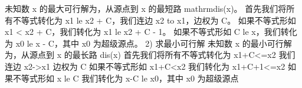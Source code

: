 {}\markdownRendererHardLineBreak
{}未知数 \markdownRendererDollarSign{}x\markdownRendererDollarSign{} 的最大可行解为，从源点到 \markdownRendererDollarSign{}x\markdownRendererDollarSign{} 的最短路 \markdownRendererDollarSign{}\markdownRendererBackslash{}mathrm\markdownRendererLeftBrace{}dis\markdownRendererRightBrace{}(x)\markdownRendererDollarSign{}。\markdownRendererHardLineBreak
{}首先我们将所有不等式转化为 \markdownRendererDollarSign{}x\markdownRendererUnderscore{}1 \markdownRendererBackslash{}le x\markdownRendererUnderscore{}2 + C\markdownRendererDollarSign{}，我们连边 \markdownRendererDollarSign{}x\markdownRendererUnderscore{}2 \markdownRendererBackslash{}to x\markdownRendererUnderscore{}1\markdownRendererDollarSign{}，边权为 \markdownRendererDollarSign{}C\markdownRendererDollarSign{}。\markdownRendererHardLineBreak
{}如果不等式形如 \markdownRendererDollarSign{}x\markdownRendererUnderscore{}1 < x\markdownRendererUnderscore{}2 + C\markdownRendererDollarSign{}，我们转化为 \markdownRendererDollarSign{}x\markdownRendererUnderscore{}1 \markdownRendererBackslash{}le x\markdownRendererUnderscore{}2 + C - 1\markdownRendererDollarSign{}。\markdownRendererHardLineBreak
{}如果不等式形如 \markdownRendererDollarSign{}C \markdownRendererBackslash{}le x\markdownRendererDollarSign{}，我们转化为 \markdownRendererDollarSign{}x\markdownRendererUnderscore{}0 \markdownRendererBackslash{}le x - C\markdownRendererDollarSign{}，其中 \markdownRendererDollarSign{}x\markdownRendererUnderscore{}0\markdownRendererDollarSign{} 为超级源点。\markdownRendererParagraphSeparator
{}\markdownRendererDollarSign{} 2) \markdownRendererDollarSign{}求最小可行解\markdownRendererParagraphSeparator
{}未知数\markdownRendererDollarSign{} x \markdownRendererDollarSign{}的最小可行解为，从源点到\markdownRendererDollarSign{} x \markdownRendererDollarSign{}的最长路\markdownRendererDollarSign{} dis(x) \markdownRendererDollarSign{}\markdownRendererParagraphSeparator
{}首先我们将所有不等式转化为\markdownRendererDollarSign{} x1+C<=x2 \markdownRendererDollarSign{} 我们连边\markdownRendererDollarSign{} x2->x1 \markdownRendererDollarSign{} 边权为\markdownRendererDollarSign{} C \markdownRendererDollarSign{}\markdownRendererParagraphSeparator
{}如果不等式形如\markdownRendererDollarSign{} x1+C<x2 \markdownRendererDollarSign{} 我们转化为\markdownRendererDollarSign{} x1+C+1<=x2 \markdownRendererDollarSign{}\markdownRendererParagraphSeparator
{}如果不等式形如 \markdownRendererDollarSign{}x \markdownRendererBackslash{}le C\markdownRendererDollarSign{} 我们转化为 \markdownRendererDollarSign{}x-C \markdownRendererBackslash{}le x\markdownRendererUnderscore{}0\markdownRendererDollarSign{}，其中 \markdownRendererDollarSign{}x\markdownRendererUnderscore{}0\markdownRendererDollarSign{} 为超级源点\markdownRendererParagraphSeparator
